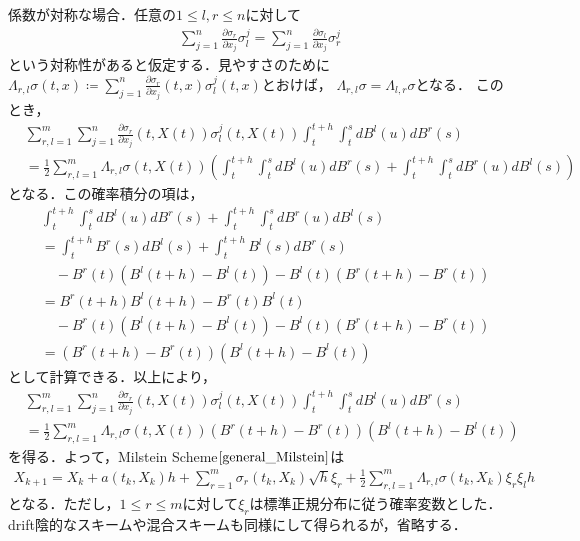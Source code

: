 \documentclass[dvipdfmx,autodetect-engine]{jsarticle}
\theoremstyle{remark}
\theoremstyle{definition}
\begin{document}
係数が対称な場合．任意の$1\leq l,r\leq n$に対して
\begin{align}
    \sum_{j=1}^{n} \frac{\partial \sigma_{r}}{\partial x_{j}} \sigma_{l}^{j}
    = \sum_{j=1}^{n} \frac{\partial \sigma_{l}}{\partial x_{j}} \sigma_{r}^{j}
\end{align}
という対称性があると仮定する．見やすさのために
$\Lambda_{r,l}\sigma (t,x) \coloneqq \sum_{j=1}^{n} 
\frac{\partial \sigma_{r}}{\partial x_{j}} (t,x) \sigma_{l}^{j}(t,x)$とおけば，
$\Lambda_{r,l}\sigma = \Lambda_{l,r}\sigma$となる．
このとき，
\begin{align}
    & \sum_{r,l=1}^{m} \sum_{j=1}^{n} 
        \frac{\partial \sigma_{r}}{\partial x_{j}}(t,X(t)) \sigma_{l}^{j}(t,X(t)) 
        \int_{t}^{t+h} \int_{t}^{s} dB^{l}(u) dB^{r}(s)\\
    &= \frac{1}{2} \sum_{r,l=1}^{m} \Lambda_{r,l}\sigma(t,X(t))
    \left(\int_{t}^{t+h} \int_{t}^{s} dB^{l}(u) dB^{r}(s) + 
    \int_{t}^{t+h} \int_{t}^{s} dB^{r}(u) dB^{l}(s)\right)
\end{align}
となる．この確率積分の項は，
\begin{align}
    &\int_{t}^{t+h} \int_{t}^{s} dB^{l}(u) dB^{r}(s) + 
    \int_{t}^{t+h} \int_{t}^{s} dB^{r}(u) dB^{l}(s) \\
    &= \int_{t}^{t+h} B^{r}(s) dB^{l}(s) + \int_{t}^{t+h} B^{l}(s) dB^{r}(s)\\
    &\quad - B^{r}(t)(B^{l}(t+h)-B^{l}(t)) - B^{l}(t)(B^{r}(t+h)-B^{r}(t))\\
    &= B^{r}(t+h)B^{l}(t+h) - B^{r}(t)B^{l}(t) \\
    &\quad - B^{r}(t)(B^{l}(t+h)-B^{l}(t)) - B^{l}(t)(B^{r}(t+h)-B^{r}(t))\\
    &= (B^{r}(t+h)-B^{r}(t)) (B^{l}(t+h)-B^{l}(t))
\end{align}
として計算できる．以上により，
\begin{align}
    &\sum_{r,l=1}^{m} \sum_{j=1}^{n} 
        \frac{\partial \sigma_{r}}{\partial x_{j}}(t,X(t)) \sigma_{l}^{j}(t,X(t)) 
        \int_{t}^{t+h} \int_{t}^{s} dB^{l}(u) dB^{r}(s) \\
    &= \frac{1}{2} \sum_{r,l=1}^{m} \Lambda_{r,l}\sigma(t,X(t))
    (B^{r}(t+h)-B^{r}(t)) (B^{l}(t+h)-B^{l}(t))
\end{align}
を得る．よって，Milstein Scheme$\eqref{general_Milstein}$は
\begin{align}
    X_{k+1} = X_{k} + a(t_{k},X_{k})h 
    + \sum_{r=1}^{m} \sigma_{r}(t_{k},X_{k})\sqrt{h}\xi_{r}
     + \frac{1}{2} \sum_{r,l=1}^{m} \Lambda_{r,l}\sigma(t_{k},X_{k})
    \xi_{r} \xi_{l} h
\end{align}
となる．ただし，$1\leq r\leq m$に対して$\xi_{r}$は標準正規分布に従う確率変数とした．
drift陰的なスキームや混合スキームも同様にして得られるが，省略する．
\end{document}
